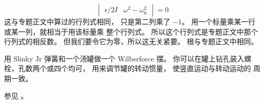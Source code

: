\begin{exercises}
\begin{answer}
\begin{equation*}
\begin{vmatrix}
       \epsilon/2I           &\omega^2-\omega_0^2 
      \end{vmatrix}
      =0
    \end{equation*}
    这与专题正文中算过的行列式相同，
    只是第二列乘了 $-1$。
    用一个标量乘某一行或某一列，就相当于用该标量乘
    整个行列式。
    所以这个行列式是专题正文中那个行列式的相反数。
    但我们要令它为零，所以这无关紧要。
    根与专题正文中相同。
  \end{answer}
\item 用 Slinky Jr 弹簧和一个汤罐做一个 Wilberforce 摆。
  你可以在罐上钻孔装入螺栓，孔数两个或四个均可，
  用来调节罐的转动惯量，
  使竖直运动与转动运动的
  周期一致。
  \begin{answer}
    参见 \cite{Mewes}。
  \end{answer}
\end{exercises}
\endinput
% 
